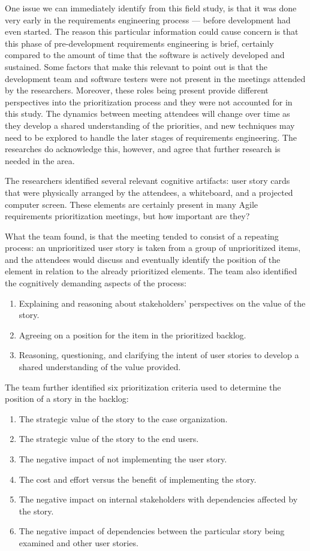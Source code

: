 One issue we can immediately identify from this field study, is that it was done very early in the requirements engineering process --- before development had even started. The reason this particular information could cause concern is that this phase of pre-development requirements engineering is brief, certainly compared to the amount of time that the software is actively developed and sustained. Some factors that make this relevant to point out is that the development team and software testers were not present in the meetings attended by the researchers. Moreover, these roles being present provide different perspectives into the prioritization process and they were not accounted for in this study. The dynamics between meeting attendees will change over time as they develop a shared understanding of the priorities, and new techniques may need to be explored to handle the later stages of requirements engineering. The researches do acknowledge this, however, and agree that further research is needed in the area.

The researchers identified several relevant cognitive artifacts: user story cards that were physically arranged by the attendees, a whiteboard, and a projected computer screen. These elements are certainly present in many Agile requirements prioritization meetings, but how important are they?

What the team found, is that the meeting tended to consist of a repeating process: an unprioritized user story is taken from a group of unprioritized items, and the attendees would discuss and eventually identify the position of the element in relation to the already prioritized elements. The team also identified the cognitively demanding aspects of the process:
\begin{enumerate}
\item Explaining and reasoning about stakeholders' perspectives on the value of the story.
\item Agreeing on a position for the item in the prioritized backlog.
\item Reasoning, questioning, and clarifying the intent of user stories to develop a shared understanding of the value provided.\cite{buchan2020applying}
\end{enumerate}

The team further identified six prioritization criteria used to determine the position of a story in the backlog:
\begin{enumerate}
\item The strategic value of the story to the case organization.
\item The strategic value of the story to the end users.
\item The negative impact of not implementing the user story.
\item The cost and effort versus the benefit of implementing the story.
\item The negative impact on internal stakeholders with dependencies affected by the story.
\item The negative impact of dependencies between the particular story being examined and other user stories.\cite{buchan2020applying}
\end{enumerate}

